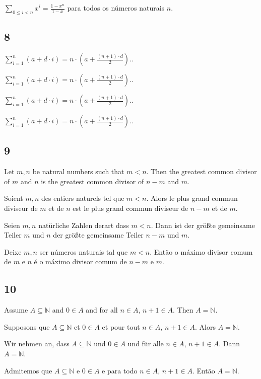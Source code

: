 \documentclass{article}
\newcommand{\sumgeom}[2]{\sum_{0 \leq i < #2} {#1}^i}
\newcommand{\sumarith}[3]{\sum_{i = 1}^{#3}(#1 + #2 \cdot i)}
\begin{document}
$ \sumgeom{x}{n} = \frac{1 - x^{n}}{1 - x} $ para todos os números naturais $ n $.

\subsection*{8}

$ \sumarith{a}{d}{n} = n \cdot ( a + \frac{(n + 1) \cdot d}{2}). $.

$ \sumarith{a}{d}{n} = n \cdot ( a + \frac{(n + 1) \cdot d}{2}). $.

$ \sumarith{a}{d}{n} = n \cdot ( a + \frac{(n + 1) \cdot d}{2}). $.

$ \sumarith{a}{d}{n} = n \cdot ( a + \frac{(n + 1) \cdot d}{2}). $.

\subsection*{9}

Let $ m, n $ be natural numbers such that $ m < n $. Then the greatest common divisor of $ m $ and $ n $ is the greatest common divisor of $ n-m $ and $ m $.

Soient $ m, n $ des entiers naturels tel que $ m < n $. Alors le plus grand commun diviseur de $ m $ et de $ n $ est le plus grand commun diviseur de $ n-m $ et de $ m $.

Seien $ m, n $ natürliche Zahlen derart dass $ m < n $. Dann ist der größte gemeinsame Teiler $ m $ und $ n $ der größte gemeinsame Teiler $ n-m $ und $ m $.

Deixe $ m, n $ ser números naturais tal que $ m < n $. Então o máximo divisor comum de $ m $ e $ n $ é o máximo divisor comum de $ n-m $ e $ m $.

\subsection*{10}

Assume $ A \subseteq \mathbb{N} $ and $ 0 \in A $ and for all $ n \in A $, $ n + 1 \in A $. Then $ A = \mathbb{N} $.

Supposons que $ A \subseteq \mathbb{N} $ et $ 0 \in A $ et pour tout $ n \in A $, $ n + 1 \in A $. Alors $ A = \mathbb{N} $.

Wir nehmen an, dass $ A \subseteq \mathbb{N} $ und $ 0 \in A $ und für alle $ n \in A $, $ n + 1 \in A $. Dann $ A = \mathbb{N} $.

Admitemos que $ A \subseteq \mathbb{N} $ e $ 0 \in A $ e para todo $ n \in A $, $ n + 1 \in A $. Então $ A = \mathbb{N} $.
\end{document}

